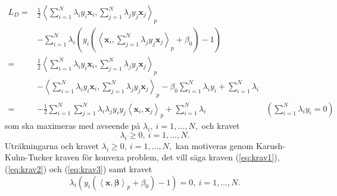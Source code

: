 \documentclass[a4paper, 12pt]{report}
\theoremstyle{definition}
\theoremstyle{remark}
\newcommand{\bfbeta}{{\boldsymbol{\beta}}}
\newcommand{\bfx}{\mathbf{x}}
\newcommand{\llangle}{\left\langle}
\newcommand{\rrangle}{\right\rangle}
\newcommand{\inner}[2]{\llangle #1, #2 \rrangle}
\begin{document}
\begin{equation*}
\begin{aligned}
	L_D=&\frac{1}{2}\inner{\sum_{i=1}^{N}\lambda_i y_i \mathbf{x}_i}{ \sum_{j=1}^{N}\lambda_j y_j \mathbf{x}_j}_p&\\
	&- \sum_{i=1}^{N}\lambda_i \left( y_i \left(\inner{\mathbf{x}_i}{ \sum_{j=1}^{N}\lambda_j y_j \bfx_j}_p + \beta_0 \right) -1\right)&\\
	=& \frac{1}{2} \inner{\sum_{i=1}^{N} \lambda_i y_i \bfx_i}{\sum_{j=1}^{N} \lambda_j y_j \bfx_j}_p &\\
	&- \inner{\sum_{i=1}^{N}\lambda_i y_i \mathbf{x}_i}{\sum_{j=1}^{N} \lambda_j y_j \mathbf{x}_j}_p - \beta_0 \sum_{i=1}^{N} \lambda_i y_i  + \sum_{i=1}^{N} \lambda_i&\\
	=& -\frac{1}{2} \sum_{i=1}^{N} \sum_{j=1}^{N} \lambda_i \lambda_j y_i y_j \inner{\mathbf{x}_i}{\mathbf{x}_j}_p + \sum_{i=1}^{N} \lambda_i &\textstyle{\left(\sum\limits_{i=1}^{N}\lambda_iy_i = 0\right)}
\end{aligned}
\end{equation*}
som ska maximeras med avseende på $\lambda_i,~i=1,\dots,N,$ och kravet \begin{equation}\label{eq:krav3}
	\lambda_i\geq 0,~i=1,\dots,N.
\end{equation} Uträkningarna och kravet $\lambda_i\geq 0,~i=1,\dots,N,$ kan motiveras genom Karush-Kuhn-Tucker kraven \cite{Boyd} för konvexa problem, det vill säga kraven (\ref{eq:krav1}), (\ref{eq:krav2}) och (\ref{eq:krav3}) samt kravet %
\begin{equation}\label{eq:krav4}
	\lambda_i\left( y_i\left( \inner{\bfx}{\bfbeta}_p + \beta_0 \right) -1 \right) = 0,~i=1,\dots, N.
\end{equation}
\end{document}
